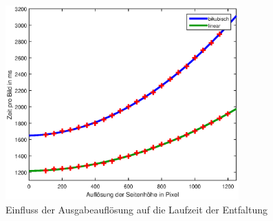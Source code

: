 \begin{figure}[!htb]
	\centering
	\includegraphics[width=0.8\textwidth]{images/runningTimePerSlantheight.eps}
	\caption{Einfluss der Ausgabeauflösung auf die Laufzeit der Entfaltung}
	\label{fig:influenceRes2}
\end{figure}

